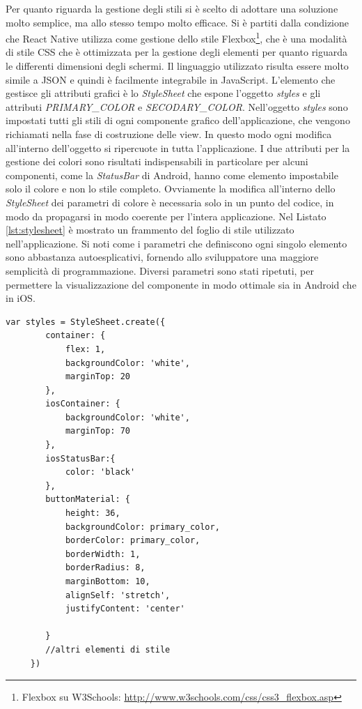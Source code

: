 Per quanto riguarda la gestione degli stili si è scelto di adottare una soluzione molto semplice, ma allo stesso tempo molto efficace. Si è partiti dalla condizione che React Native utilizza come gestione dello stile Flexbox\footnote{Flexbox su W3Schools: \url{http://www.w3schools.com/css/css3_flexbox.asp}}, che è una modalità di stile CSS che è ottimizzata per la gestione degli elementi per quanto riguarda le differenti dimensioni degli schermi. Il linguaggio utilizzato risulta essere molto simile a JSON e quindi è facilmente integrabile in JavaScript. L'elemento che gestisce gli attributi grafici è lo \emph{StyleSheet} che espone l'oggetto \emph{styles} e gli attributi \emph{PRIMARY\_COLOR} e \emph{SECODARY\_COLOR}.
Nell'oggetto \emph{styles} sono impostati tutti gli stili di ogni componente grafico dell'applicazione, che vengono richiamati nella fase di costruzione delle view. In questo modo ogni modifica all'interno dell'oggetto si ripercuote in tutta l'applicazione.
I due attributi per la gestione dei colori sono risultati indispensabili in particolare per alcuni componenti, come la \emph{StatusBar} di Android, hanno come elemento impostabile solo il colore e non lo stile completo. Ovviamente la modifica all'interno dello \emph{StyleSheet} dei parametri di colore è necessaria solo in un punto del codice, in modo da propagarsi in modo coerente per l'intera applicazione.
Nel Listato \ref{lst:stylesheet} è mostrato un frammento del foglio di stile utilizzato nell'applicazione. Si noti come i parametri che definiscono ogni singolo elemento sono abbastanza autoesplicativi, fornendo allo sviluppatore una maggiore semplicità di programmazione. Diversi parametri sono stati ripetuti, per permettere la visualizzazione del componente in modo ottimale sia in Android che in iOS.

\begin{lstlisting}[backgroundcolor = \color{lightgray},
								caption = Frammento Foglio di Stile,
								label = lst:stylesheet]
	var styles = StyleSheet.create({
	    container: {
	        flex: 1,
	        backgroundColor: 'white',
	        marginTop: 20
	    },
	    iosContainer: {
	        backgroundColor: 'white',
	        marginTop: 70
	    },
	    iosStatusBar:{
	        color: 'black'
	    },
	    buttonMaterial: {
	        height: 36,
	        backgroundColor: primary_color,
	        borderColor: primary_color,
	        borderWidth: 1,
	        borderRadius: 8,
	        marginBottom: 10,
	        alignSelf: 'stretch',
	        justifyContent: 'center'
	
	    }
	    //altri elementi di stile
	 })   
\end{lstlisting}
 

